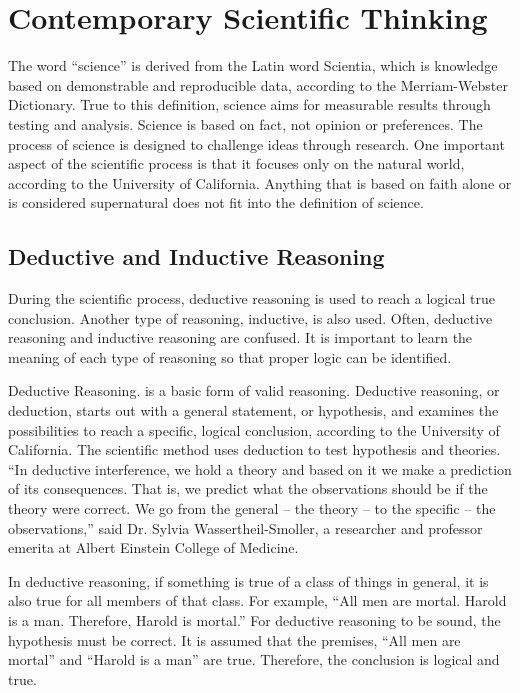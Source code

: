 \section{Contemporary Scientific Thinking}

The word ``science'' is derived from the Latin word Scientia, which is knowledge based on demonstrable and reproducible data, according to the Merriam-Webster Dictionary. True to this definition, science aims for measurable results through testing and analysis. Science is based on fact, not opinion or preferences. The process of science is designed to challenge ideas through research. One important aspect of the scientific process is that it focuses only on the natural world, according to the University of California. Anything that is based on faith alone or is considered supernatural does not fit into the definition of science.

\subsection{Deductive and Inductive Reasoning}

During the scientific process, deductive reasoning is used to reach a logical true conclusion. Another type of reasoning, inductive, is also used. Often, deductive reasoning and inductive reasoning are confused. It is important to learn the meaning of each type of reasoning so that proper logic can be identified.

Deductive Reasoning. is a basic form of valid reasoning. Deductive reasoning, or deduction, starts out with a general statement, or hypothesis, and examines the possibilities to reach a specific, logical conclusion, according to the University of California. The scientific method uses deduction to test hypothesis and theories. ``In deductive interference, we hold a theory and based on it we make a prediction of its consequences. That is, we predict what the observations should be if the theory were correct. We go from the general – the theory – to the specific – the observations,'' said Dr. Sylvia Wassertheil-Smoller, a researcher and professor emerita at Albert Einstein College of Medicine.

In deductive reasoning, if something is true of a class of things in general, it is also true for all members of that class. For example, ``All men are mortal. Harold is a man. Therefore, Harold is mortal.''  For deductive reasoning to be sound, the hypothesis must be correct. It is assumed that the premises, ``All men are mortal'' and ``Harold is a man'' are true. Therefore, the conclusion is logical and true.

